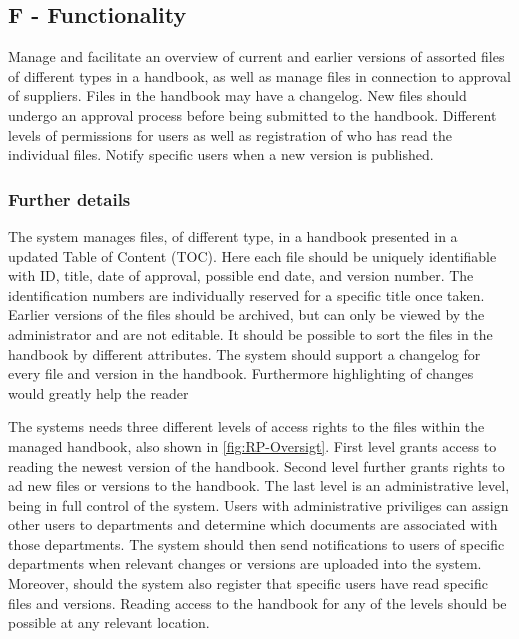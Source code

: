 \subsection{F - Functionality}\label{sec:FACTOR-functionality}
Manage and facilitate an overview of current and earlier versions of assorted files of different types in a handbook, as well as manage files in connection to approval of suppliers.
Files in the handbook may have a changelog.
New files should undergo an approval process before being submitted to the handbook. 
Different levels of permissions for users as well as registration of who has read the individual files. 
Notify specific users when a new version is published.

\subsubsection{Further details}
The system manages files, of different type, in a handbook presented in a updated Table of Content (TOC).
Here each file should be uniquely identifiable with ID, title, date of approval, possible end date, and version number. 
The identification numbers are individually reserved for a specific title once taken.
Earlier versions of the files should be archived, but can only be viewed by the administrator and are not editable.
It should be possible to sort the files in the handbook by different attributes.
The system should support a changelog for every file and version in the handbook. 
Furthermore highlighting of changes would greatly help the reader

The systems needs three different levels of access rights to the files within the managed handbook, also shown in \cref{fig:RP-Oversigt}.
First level grants access to reading the newest version of the handbook. 
Second level further grants rights to ad new files or versions to the handbook. 
The last level is an administrative level, being in full control of the system.
Users with administrative priviliges can assign other users to departments and determine which documents are associated with those departments.
The system should then send notifications to users of specific departments when relevant changes or versions are uploaded into the system.
Moreover, should the system also register that specific users have read specific files and versions.
Reading access to the handbook for any of the levels should be possible at any relevant location.

